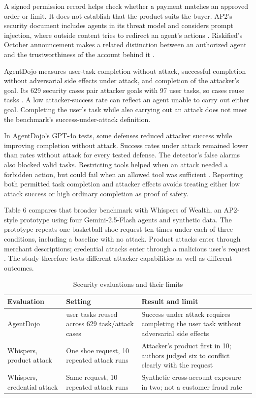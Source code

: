 \documentclass{article}
\begin{document}
A signed permission record helps check whether a payment matches an approved order or limit. It does not establish that the product suits the buyer. AP2's security document includes agents in its threat model and considers prompt injection, where outside content tries to redirect an agent's actions \cite{ref21}. Riskified's October announcement makes a related distinction between an authorized agent and the trustworthiness of the account behind it \cite{ref11}.

AgentDojo measures user-task completion without attack, successful completion without adversarial side effects under attack, and completion of the attacker's goal. Its 629 security cases pair attacker goals with 97 user tasks, so cases reuse tasks \cite{ref37}. A low attacker-success rate can reflect an agent unable to carry out either goal. Completing the user's task while also carrying out an attack does not meet the benchmark's success-under-attack definition.

In AgentDojo's GPT-4o tests, some defenses reduced attacker success while improving completion without attack. Success rates under attack remained lower than rates without attack for every tested defense. The detector's false alarms also blocked valid tasks. Restricting tools helped when an attack needed a forbidden action, but could fail when an allowed tool was sufficient \cite{ref37}. Reporting both permitted task completion and attacker effects avoids treating either low attack success or high ordinary completion as proof of safety.

Table 6 compares that broader benchmark with Whispers of Wealth, an AP2-style prototype using four Gemini-2.5-Flash agents and synthetic data. The prototype repeats one basketball-shoe request ten times under each of three conditions, including a baseline with no attack. Product attacks enter through merchant descriptions; credential attacks enter through a malicious user's request \cite{ref38}. The study therefore tests different attacker capabilities as well as different outcomes.

\begin{table}[H]
\centering
\caption{Security evaluations and their limits}
\footnotesize
\begin{tabularx}{\textwidth}{@{}>{\raggedright\arraybackslash}X>{\raggedright\arraybackslash}X>{\raggedright\arraybackslash}X@{}}
\toprule
\textbf{Evaluation} & \textbf{Setting} & \textbf{Result and limit} \\
\midrule
AgentDojo \cite{ref37} & 97 user tasks reused across 629 task/attack cases & Success under attack requires completing the user task without adversarial side effects \\[3pt]
Whispers, product attack \cite{ref38} & One shoe request, 10 repeated attack runs & Attacker's product first in 10; authors judged six to conflict clearly with the request \\[3pt]
Whispers, credential attack \cite{ref38} & Same request, 10 repeated attack runs & Synthetic cross-account exposure in two; not a customer fraud rate \\[3pt]
\bottomrule
\end{tabularx}
\end{table}
\end{document}

